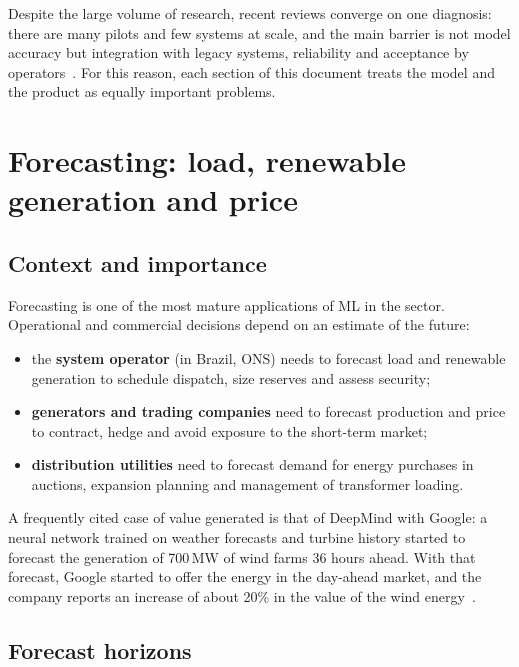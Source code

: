 \documentclass[10pt,a4paper,oneside]{article}
\begin{document}
Despite the large volume of research, recent reviews converge on one
diagnosis: there are many pilots and few systems at scale, and the main
barrier is not model accuracy but integration with legacy systems,
reliability and acceptance by operators~\cite{energyinformatics2025,trustworthy2024}.
For this reason, each section of this document treats the model and the
product as equally important problems.

\section{Forecasting: load, renewable generation and price}

\subsection{Context and importance}

Forecasting is one of the most mature applications of ML in the sector.
Operational and commercial decisions depend on an estimate of the future:

\begin{itemize}
  \item the \textbf{system operator} (in Brazil, ONS) needs to forecast load
    and renewable generation to schedule dispatch, size reserves and assess
    security;
  \item \textbf{generators and trading companies} need to forecast production
    and price to contract, hedge and avoid exposure to the short-term
    market;
  \item \textbf{distribution utilities} need to forecast demand for energy
    purchases in auctions, expansion planning and management of transformer
    loading.
\end{itemize}

A frequently cited case of value generated is that of DeepMind with Google: a
neural network trained on weather forecasts and turbine history started to
forecast the generation of 700\,MW of wind farms 36 hours ahead. With that
forecast, Google started to offer the energy in the day-ahead market, and the
company reports an increase of about 20\% in the value of the wind
energy~\cite{deepmindwind}.

\subsection{Forecast horizons}
\end{document}
